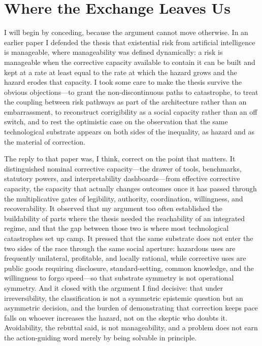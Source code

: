 \documentclass[11pt]{article}
\begin{document}
\begin{abstract}
the first time: not whether AI is safe, nor whether the risk is manageable, but whether a civilization in a race can hold its reversibility margin above zero when every local incentive is to spend it.
\end{abstract}

\section{Where the Exchange Leaves Us}
\label{sec:where}

I will begin by conceding, because the argument cannot move otherwise. In an earlier paper I defended the thesis that existential risk from artificial intelligence is manageable, where manageability was defined dynamically: a risk is manageable when the corrective capacity available to contain it can be built and kept at a rate at least equal to the rate at which the hazard grows and the hazard erodes that capacity. I took some care to make the thesis survive the obvious objections---to grant the non-discontinuous paths to catastrophe, to treat the coupling between risk pathways as part of the architecture rather than an embarrassment, to reconstruct corrigibility as a social capacity rather than an off switch, and to rest the optimistic case on the observation that the same technological substrate appears on both sides of the inequality, as hazard and as the material of correction.

The reply to that paper was, I think, correct on the point that matters. It distinguished nominal corrective capacity---the drawer of tools, benchmarks, statutory powers, and interpretability dashboards---from effective corrective capacity, the capacity that actually changes outcomes once it has passed through the multiplicative gates of legibility, authority, coordination, willingness, and recoverability. It observed that my argument too often established the buildability of parts where the thesis needed the reachability of an integrated regime, and that the gap between those two is where most technological catastrophes set up camp. It pressed that the same substrate does not enter the two sides of the race through the same social aperture: hazardous uses are frequently unilateral, profitable, and locally rational, while corrective uses are public goods requiring disclosure, standard-setting, common knowledge, and the willingness to forgo speed---so that substrate symmetry is not operational symmetry. And it closed with the argument I find decisive: that under irreversibility, the classification is not a symmetric epistemic question but an asymmetric decision, and the burden of demonstrating that correction keeps pace falls on whoever increases the hazard, not on the skeptic who doubts it. Avoidability, the rebuttal said, is not manageability, and a problem does not earn the action-guiding word merely by being solvable in principle.
\end{document}
